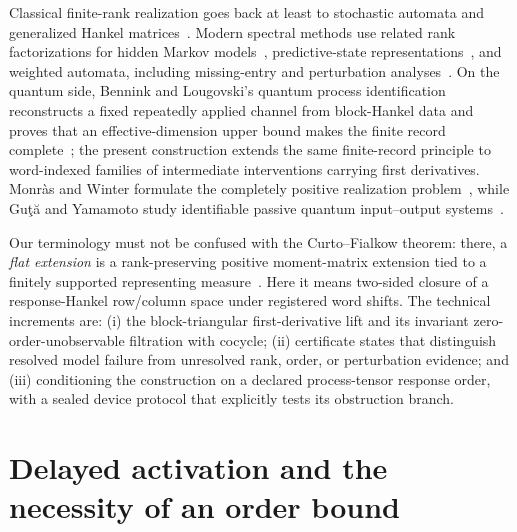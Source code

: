 \documentclass[aps,prl,reprint,superscriptaddress,nofootinbib]{revtex4-2}
\begin{document}
Classical finite-rank realization goes back at least to stochastic automata and generalized Hankel matrices~\cite{CarlylePaz1971,ArbibManes1980}.  Modern spectral methods use related rank factorizations for hidden Markov models~\cite{Hsu2012HMM}, predictive-state representations~\cite{Boots2011PSR}, and weighted automata, including missing-entry and perturbation analyses~\cite{BalleMohri2012WFA,Balle2014WFA,BalleMohri2018WFA}.  On the quantum side, Bennink and Lougovski's quantum process identification reconstructs a fixed repeatedly applied channel from block-Hankel data and proves that an effective-dimension upper bound makes the finite record complete~\cite{BenninkLougovski2019QPI}; the present construction extends the same finite-record principle to word-indexed families of intermediate interventions carrying first derivatives.  Monr\`as and Winter formulate the completely positive realization problem~\cite{MonrasWinter2016}, while Gu\c{t}\u{a} and Yamamoto study identifiable passive quantum input--output systems~\cite{GutaYamamoto2016}.

Our terminology must not be confused with the Curto--Fialkow theorem: there, a \emph{flat extension} is a rank-preserving positive moment-matrix extension tied to a finitely supported representing measure~\cite{CurtoFialkow1998}.  Here it means two-sided closure of a response-Hankel row/column space under registered word shifts.  The technical increments are: (i) the block-triangular first-derivative lift and its invariant zero-order-unobservable filtration with cocycle; (ii) certificate states that distinguish resolved model failure from unresolved rank, order, or perturbation evidence; and (iii) conditioning the construction on a declared process-tensor response order, with a sealed device protocol that explicitly tests its obstruction branch.

\section{Delayed activation and the necessity of an order bound}
\label{sec:delayed}
\end{document}
